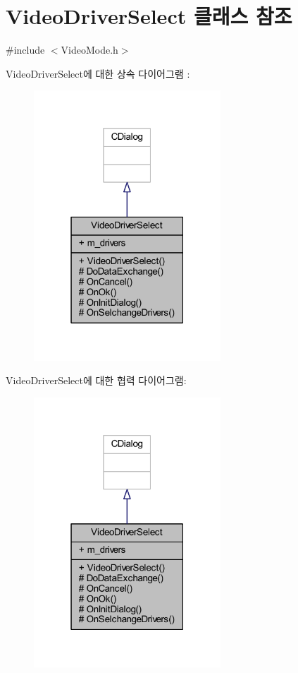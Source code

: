 \hypertarget{class_video_driver_select}{}\section{Video\+Driver\+Select 클래스 참조}
\label{class_video_driver_select}


{\ttfamily \#include $<$Video\+Mode.\+h$>$}



Video\+Driver\+Select에 대한 상속 다이어그램 \+: \nopagebreak
\begin{figure}[H]
\begin{center}
\leavevmode
\includegraphics[width=199pt]{class_video_driver_select__inherit__graph}
\end{center}
\end{figure}


Video\+Driver\+Select에 대한 협력 다이어그램\+:\nopagebreak
\begin{figure}[H]
\begin{center}
\leavevmode
\includegraphics[width=199pt]{class_video_driver_select__coll__graph}
\end{center}
\end{figure}
